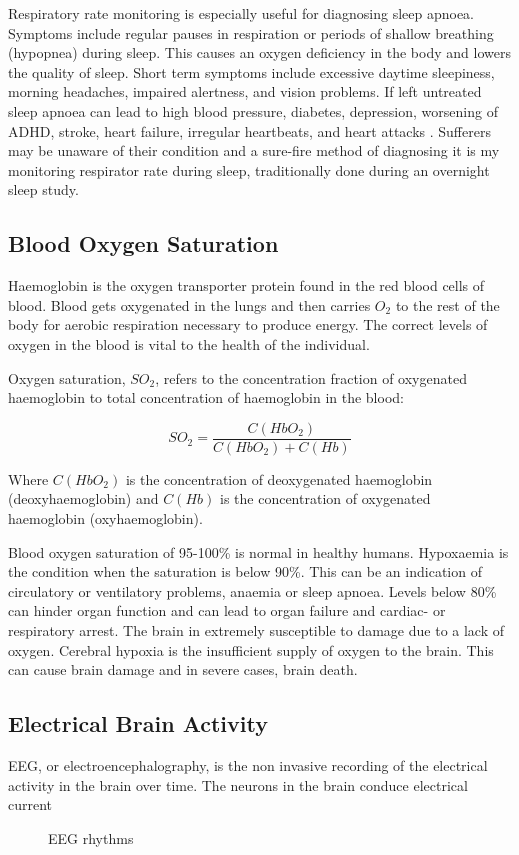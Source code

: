 \medskip
Respiratory rate monitoring is especially useful for diagnosing sleep apnoea. Symptoms include regular pauses in respiration or periods of shallow breathing (hypopnea) during sleep. This causes an oxygen deficiency in the body and lowers the quality of sleep. Short term symptoms include excessive daytime sleepiness, morning headaches, impaired alertness, and vision problems. If left untreated sleep apnoea can lead to high blood pressure, diabetes, depression, worsening of ADHD, stroke, heart failure, irregular heartbeats, and heart attacks \citep{webMDSleepApnoea}. Sufferers may be unaware of their condition and a sure-fire method of diagnosing it is my monitoring respirator rate during sleep, traditionally done during an overnight sleep study.

\subsection{Blood Oxygen Saturation}

Haemoglobin is the oxygen transporter protein found in the red blood cells of blood. Blood gets oxygenated in the lungs and then carries $O_2$ to the rest of the body for aerobic respiration necessary to produce energy. The correct levels of oxygen in the blood is vital to the health of the individual.

\medskip
Oxygen saturation, $SO_2$, refers to the concentration fraction of oxygenated haemoglobin to total concentration of haemoglobin in the blood:

$$SO_2  =  \frac{C(HbO_2)}{C(HbO_2)+C(Hb)}$$

Where $C(HbO_2)$ is the concentration of deoxygenated haemoglobin (deoxyhaemoglobin) and $C(Hb)$ is the concentration of oxygenated haemoglobin (oxyhaemoglobin).

\medskip
Blood oxygen saturation of 95-100\% is normal in healthy humans. Hypoxaemia is the condition when the saturation is below 90\%. This can be an indication of circulatory or ventilatory problems, anaemia or sleep apnoea. Levels below 80\% can hinder organ function and can lead to organ failure and cardiac- or respiratory arrest. The brain in extremely susceptible to damage due to a lack of oxygen. Cerebral hypoxia is the insufficient supply of oxygen to the brain. This can cause brain damage and in severe cases, brain death.

\subsection{Electrical Brain Activity}
EEG, or electroencephalography, is the non invasive recording of the electrical activity in the brain over time. The neurons in the brain conduce electrical current


\cite{bickford1951electroencephalography}

\begin{figure}[h]
\centering
\graphicspath{{figs/}}
\def\svgwidth{300pt}

\caption{EEG rhythms}
\label{fig:eegRhythm}
\end{figure}
